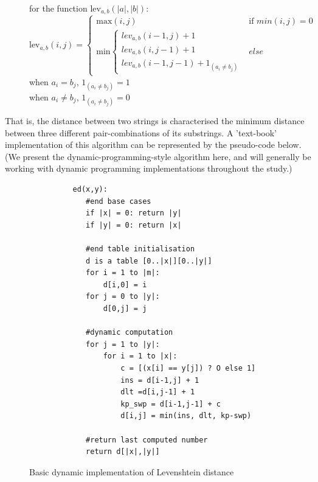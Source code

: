 \documentclass[a4paper,11pt,twoside,notitlepage]{article}
\begin{document}
        \begin{figure}[H]
          \centering
          for the function $\mbox{lev}_{a,b}(|a|,|b|)$:\\
          $$\mbox{lev}_{a,b}(i,j) = 
             \left\{
                \begin{array}{ll}
                  \mbox{max}(i,j) & \mbox{if }min(i,j) = 0\\
                  \mbox{min}\left\{
                        \begin{array}{lll}
                          lev_{a,b}(i-1,j)+1\\
                          lev_{a,b}(i,j-1)+1\\
                          lev_{a,b}(i-1,j-1)+1_{(a_i{\neq}b_j)}
                        \end{array}
                      \right.
	                & else 
	        \end{array}
             \right.$$
             when $a_i = b_j$, $1_{(a_i{\neq}b_j)} = 1$\\
             when  $a_i \neq b_j$, $1_{(a_i{\neq}b_j)} = 0$
        \end{figure}

        That is, the distance between two strings is characterised the
        minimum distance between three different pair-combinations of its
        substrings. A 'text-book' implementation of this algorithm can
        be represented by the pseudo-code below. (We present the
        dynamic-programming-style algorithm here, and will generally
        be working with dynamic programming implementations throughout
        the study.)
        
        \begin{figure}[H]
          \centering
          \begin{lstlisting}
          ed(x,y):
             #end base cases
             if |x| = 0: return |y|
             if |y| = 0: return |x|    

             #end table initialisation
             d is a table [0..|x|][0..|y|]
             for i = 1 to |m|:
                 d[i,0] = i
             for j = 0 to |y|:
                 d[0,j] = j           
             
             #dynamic computation
             for j = 1 to |y|:
                 for i = 1 to |x|:
                     c = [(x[i] == y[j]) ? O else 1]
                     ins = d[i-1,j] + 1
                     dlt =d[i,j-1] + 1
                     kp_swp = d[i-1,j-1] + c
                     d[i,j] = min(ins, dlt, kp-swp)
             
             #return last computed number
             return d[|x|,|y|]
        \end{lstlisting}
        \caption{Basic dynamic implementation of Levenshtein distance}
        \label{fig:levenshtein-dynamic}
        \end{figure}
\end{document}
